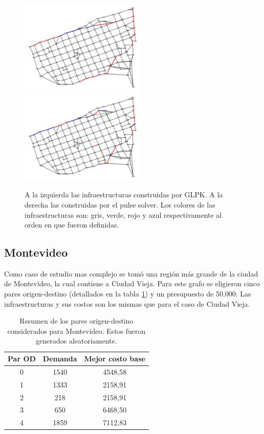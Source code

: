 \documentclass{article}
\begin{document}
  \begin{figure}[h!]
    \centering
    \includegraphics[width=6cm]{imgs/mdeo_med_glpk.png}
    \includegraphics[width=6cm]{imgs/mdeo_med_pulse.png}
    \caption{A la izquierda las infraestructuras construidas por GLPK. A la derecha las construidas por el pulse solver. Los colores de las infraestructuras son: gris, verde, rojo y azul respectivamente al orden en que fueron definidas.}
    \label{resultadosciudadvieja}
  \end{figure}

  \subsection*{Montevideo}

  Como caso de estudio mas complejo se tomó una región más grande de la ciudad de Montevideo, la cual contiene a Ciudad Vieja. Para este grafo se eligieron cinco pares origen-destino (detallados en la tabla \ref{table:odsmontevideo}) y un presupuesto de 50.000. Las infraestructuras y sus costos son los mismas que para el caso de Ciudad Vieja.

  \begin{table}[h!]
    \centering
    \begin{tabular}{ccc}
      \toprule
      Par OD & Demanda & Mejor costo base \\
      \midrule
      0 & 1540 & 4548,58 \\
      1 & 1333 & 2158,91 \\
      2 & 218 & 2158,91 \\
      3 & 650 & 6468,50 \\
      4 & 1859 & 7112,83 \\
      \bottomrule
    \end{tabular}
    \caption{Resumen de los pares origen-destino considerados para Montevideo. Estos fueron generados aleatoriamente.}\label{table:odsmontevideo}
  \end{table}
\end{document}
